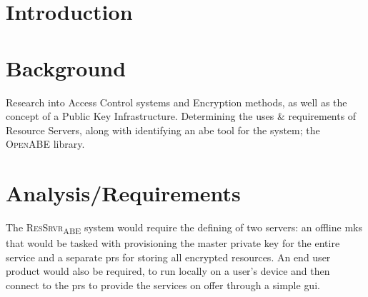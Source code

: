 \documentclass[british]{l4proj}
\begin{document}
\newcommand{\thePolicyLang}{\textsc{PolLang}\textsubscript{ABE}\xspace}
\newcommand{\theResServer}{\textsc{ResSrvr}\textsubscript{ABE}\xspace}
\newcommand{\OpenABE}{\textsc{OpenABE}\xspace}
\newcommand{\PyOpenABE}{\textsc{PyOpenABE}\xspace}

\chapter{Introduction}
\label{ch:introduction}











\chapter{Background}
\label{ch:background}

Research into Access Control systems and Encryption methods, as well as the concept of a Public Key Infrastructure. Determining the uses \& requirements of Resource Servers, along with identifying an \acrshort{abe} tool for the system; the \OpenABE library.











\chapter{Analysis/Requirements}
\label{ch:analysis}

The \theResServer system would require the defining of two servers: an offline \acrfull{mks} that would be tasked with provisioning the master private key for the entire service and a separate \acrfull{prs} for storing all encrypted resources. An end user product would also be required, to run locally on a user's device and then connect to the \acrshort{prs} to provide the services on offer through a simple \acrshort{gui}\@.
\end{document}
